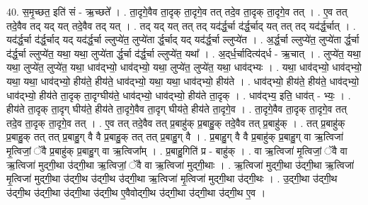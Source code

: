 \documentclass[17pt]{extarticle}
\begin{document}
40. स॒मृ॒च्छत॒ इति॑ सं - ऋ॒च्छते᳚ । . ता॒दृगे॒वैव ता॒दृक् ता॒दृगे॒व तत् तदे॒व ता॒दृक् ता॒दृगे॒व तत् । . ए॒व तत् तदे॒वैव तद् यद् यत् तदे॒वैव तद् यत् । . तद् यद् यत् तत् तद् यद॑र्द्ध॒र्चा द॑र्द्ध॒र्चाद् यत् तत् तद् यद॑र्द्ध॒र्चात् । . यद॑र्द्ध॒र्चा द॑र्द्ध॒र्चाद् यद् यद॑र्द्ध॒र्चा ल्लुप्ये॑त॒ लुप्ये॑ता र्द्ध॒र्चाद् यद् यद॑र्द्ध॒र्चा ल्लुप्ये॑त । . अ॒र्द्ध॒र्चा ल्लुप्ये॑त॒ लुप्ये॑ता र्द्ध॒र्चा द॑र्द्ध॒र्चा ल्लुप्ये॑त॒ यथा॒ यथा॒ लुप्ये॑ता र्द्ध॒र्चा द॑र्द्ध॒र्चा ल्लुप्ये॑त॒ यथा᳚ । . अ॒द्‌र्ध॒र्चादित्य॑द्‌र्ध - ऋ॒चात् । . लुप्ये॑त॒ यथा॒ यथा॒ लुप्ये॑त॒ लुप्ये॑त॒ यथा॒ धाव॑द्भ्यो॒ धाव॑द्भ्यो॒ यथा॒ लुप्ये॑त॒ लुप्ये॑त॒ यथा॒ धाव॑द्भ्यः । . यथा॒ धाव॑द्भ्यो॒ धाव॑द्भ्यो॒ यथा॒ यथा॒ धाव॑द्भ्यो॒ हीय॑ते॒ हीय॑ते॒ धाव॑द्भ्यो॒ यथा॒ यथा॒ धाव॑द्भ्यो॒ हीय॑ते । . धाव॑द्भ्यो॒ हीय॑ते॒ हीय॑ते॒ धाव॑द्भ्यो॒ धाव॑द्भ्यो॒ हीय॑ते ता॒दृक् ता॒दृग्घीय॑ते॒ धाव॑द्भ्यो॒ धाव॑द्भ्यो॒ हीय॑ते ता॒दृक् । . धाव॑द्भ्य॒ इति॒ धाव॑त् - भ्यः॒ । . हीय॑ते ता॒दृक् ता॒दृग् घीय॑ते॒ हीय॑ते ता॒दृगे॒वैव ता॒दृग् घीय॑ते॒ हीय॑ते ता॒दृगे॒व । . ता॒दृगे॒वैव ता॒दृक् ता॒दृगे॒व तत् तदे॒व ता॒दृक् ता॒दृगे॒व तत् । . ए॒व तत् तदे॒वैव तत् प्र॒बाहु॑क् प्र॒बाहु॒क् तदे॒वैव तत् प्र॒बाहु॑क् । . तत् प्र॒बाहु॑क् प्र॒बाहु॒क् तत् तत् प्र॒बाहु॒ग् वै वै प्र॒बाहु॒क् तत् तत् प्र॒बाहु॒ग् वै । . प्र॒बाहु॒ग् वै वै प्र॒बाहु॑क् प्र॒बाहु॒ग् वा ऋ॒त्विजा॑ मृ॒त्विजां॒ ॅवै प्र॒बाहु॑क् प्र॒बाहु॒ग् वा ऋ॒त्विजा᳚म् । . प्र॒बाहु॒गिति॑ प्र - बाहु॑क् । . वा ऋ॒त्विजा॑ मृ॒त्विजां॒ ॅवै वा ऋ॒त्विजा॑ मुद्‍गी॒था उ॑द्‍गी॒था ऋ॒त्विजां॒ ॅवै वा ऋ॒त्विजा॑ मुद्‍गी॒थाः । . ऋ॒त्विजा॑ मुद्‍गी॒था उ॑द्‍गी॒था ऋ॒त्विजा॑ मृ॒त्विजा॑ मुद्‍गी॒था उ॑द्‍गी॒थ उ॑द्‍गी॒थ उ॑द्‍गी॒था ऋ॒त्विजा॑ मृ॒त्विजा॑ मुद्‍गी॒था उ॑द्‍गी॒थः । . उ॒द्‍गी॒था उ॑द्‍गी॒थ उ॑द्‍गी॒थ उ॑द्‍गी॒था उ॑द्‍गी॒था उ॑द्‍गी॒थ ए॒वैवोद्‍गी॒थ उ॑द्‍गी॒था उ॑द्‍गी॒था उ॑द्‍गी॒थ ए॒व । \newline
\end{document}
